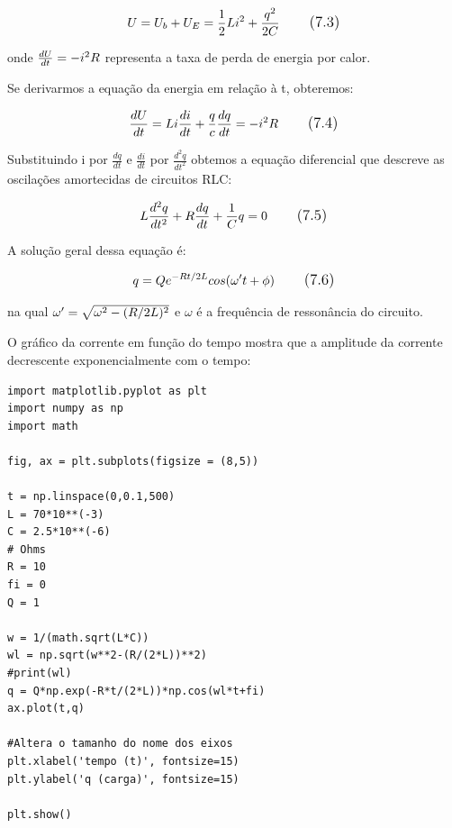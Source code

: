 \begin{equation}
\large U = U_{b} + U_{E} = \frac{1}{2}Li^2+\frac{q^2}{2C}
\tag{7.3}
\end{equation}

onde $\large \frac{dU}{dt} = -i^2R$ representa a taxa de perda de energia por calor.

Se derivarmos a equação da energia em relação à t, obteremos:

\begin{equation}
\large \frac{dU}{dt} = Li\frac{di}{dt} + \frac{q}{c}\frac{dq}{dt} = -i^2R
\tag{7.4}
\end{equation}

Substituindo i por $\frac{dq}{dt}$ e $\frac{di}{dt}$ por $\frac{d^2q}{dt^2}$ obtemos a equação diferencial que descreve as oscilações amortecidas de circuitos RLC:

\begin{equation}
\large L\frac{d^2q}{dt^2}+R\frac{dq}{dt}+\frac{1}{C}q = 0
\tag{7.5}
\end{equation}

A solução geral dessa equação é:

\begin{equation}
\large q = Qe^{-Rt/2L}cos(\omega't + \phi)
\tag{7.6}
\end{equation}

na qual $\large \omega' = \sqrt{\omega^2-(R/2L)^2}$ e $\omega$ é a frequência de ressonância do circuito.

O gráfico da corrente em função do tempo mostra que a amplitude da corrente decrescente exponencialmente com o tempo:

\begin{verbatim}
import matplotlib.pyplot as plt
import numpy as np
import math

fig, ax = plt.subplots(figsize = (8,5))

t = np.linspace(0,0.1,500)
L = 70*10**(-3)
C = 2.5*10**(-6)
# Ohms
R = 10
fi = 0
Q = 1

w = 1/(math.sqrt(L*C))
wl = np.sqrt(w**2-(R/(2*L))**2)
#print(wl)
q = Q*np.exp(-R*t/(2*L))*np.cos(wl*t+fi)
ax.plot(t,q)

#Altera o tamanho do nome dos eixos
plt.xlabel('tempo (t)', fontsize=15) 
plt.ylabel('q (carga)', fontsize=15)

plt.show()
\end{verbatim}

